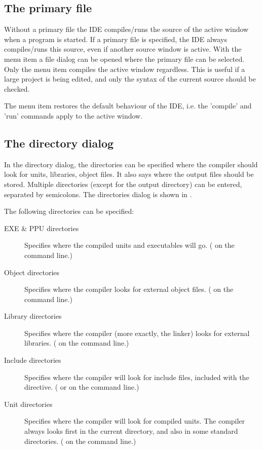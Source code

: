 \subsection{The primary file}
\label{se:primaryfile}
Without a primary file the IDE compiles/runs the source of the active
window when a program is started. If a primary file is specified,
the IDE always compiles/runs this source, even if another
source window is active. With the menu item 
a file dialog can be opened where the primary file can be selected.
Only the menu item  compiles the active window
regardless. This is useful if a large project is being edited, and 
only the syntax of the current source should be checked.

The menu item  restores the default
behaviour of the IDE, i.e. the 'compile' and 'run' commands apply to the
active window.
%
%
\subsection{The directory dialog}
In the directory dialog, the directories can be specified where the
compiler should look for units, libraries, object files. It also says
where the output files should be stored. Multiple directories (except
for the output directory) can be entered, separated by semicolons.
The directories dialog is shown in .


The following directories can be specified:
\begin{description}
\item[EXE \& PPU directories] Specifies where the compiled units and
executables will go. ( on the command line.)
\item[Object directories] Specifies where the compiler looks for external
object files. ( on the command line.)
\item[Library directories] Specifies where the compiler (more exactly, the
linker) looks for external libraries. ( on the command line.)
\item[Include directories] Specifies where the compiler will look for
include files, included with the  directive.
( or  on the command line.)
\item[Unit directories] Specifies where the compiler will look for compiled
units. The compiler always looks first in the current directory, and also in
some standard directories. ( on the command line.)
\end{description}
%
%
